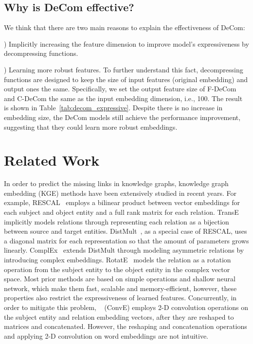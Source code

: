 \documentclass[letterpaper]{article} \usepackage{aaai20}  \usepackage{times}  \usepackage{helvet} \usepackage{courier}  \usepackage{booktabs}
\begin{document}
\subsection{Why is DeCom effective?}
We think that there are two main reasons to explain the effectiveness of DeCom:

) Implicitly increasing the feature dimension to improve model's expressiveness by decompressing functions.  

) Learning more robust features. To further understand this fact, decompressing functions are designed to keep the size of input features (original embedding) and output ones the same. Specifically, we set the output feature size of F-DeCom and C-DeCom the same as the input embedding dimension, i.e., 100. The result is shown in Table~\ref{tab:decom_expressive}. 
Despite there is no increase in embedding size, the DeCom models still achieve the performance improvement, suggesting that they could learn more robust embeddings.



\section{Related Work}
In order to predict the missing links in knowledge graphs,  
knowledge graph embedding (KGE) methods have been extensively studied in recent years. 
For example, RESCAL~\cite{nickel2011three}  employs a bilinear product between vector embeddings for each subject and object entity and a full rank matrix for each relation.
TransE~\cite{bordes2013translating} implicitly models relations through representing each relation as a bijection between source and target entities. DistMult~\cite{yang2014embedding}, as a special case of RESCAL, uses a diagonal matrix for each representation so that the amount of parameters grows linearly.  
ComplEx~\cite{trouillon2016complex} extends DistMult through modeling asymmetric relations by introducing complex embeddings. RotatE~\cite{sun2019rotate} models the relation as a rotation operation from the subject entity to the object entity in the complex vector space.
Most prior methods are based on simple operations and shallow neural network, which make them fast, scalable and memory-efficient, however, these properties also restrict the expressiveness of learned features. Concurrently, in order to mitigate this problem, \citeauthor{dettmers2018convolutional}~ (ConvE) employs 2-D convolution operations on the subject entity and relation embedding vectors, after they are reshaped to matrices and concatenated. However, the reshaping and concatenation operations and applying 2-D convolution on word embeddings are not intuitive.
\end{document}
